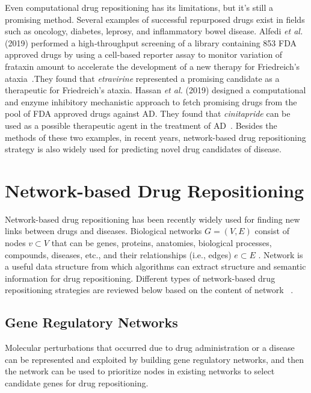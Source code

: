 Even computational drug repositioning has its limitations, but it’s still a promising method. Several examples of successful repurposed drugs exist in fields such as oncology, diabetes, leprosy, and inflammatory bowel disease. Alfedi \textit{et al.} (2019) performed a high‐throughput screening of a library containing 853 FDA approved drugs by using a cell‐based reporter assay to monitor variation of frataxin amount to accelerate the development of a new therapy for Friedreich's ataxia~\cite{kalathur_unihi_2014}.They found that \textit{etravirine} represented a promising candidate as a therapeutic for Friedreich's ataxia. Hassan \textit{et al.} (2019) designed a computational and enzyme inhibitory mechanistic approach to fetch promising drugs from the pool of FDA approved drugs against \ac{AD}. They found that \textit{cinitapride} can be used as a possible therapeutic agent in the treatment of \ac{AD}~\cite{law_drugbank_2014}. Besides the methods of these two examples, in recent years, network-based drug repositioning strategy is also widely used for predicting novel drug candidates of disease. 

\section{Network-based Drug Repositioning} \label{network_based}

Network-based drug repositioning has been recently widely used for finding new links between drugs and diseases. Biological networks $G = (V, E)$ consist of nodes $v \subset V$ that can be genes, proteins, anatomies, biological processes, compounds, diseases, etc., and their relationships (i.e., edges) $e \subset E$ . Network is a useful data structure from which algorithms can extract structure and semantic information for drug repositioning. Different types of network-based drug repositioning strategies are reviewed below based on the content of network ~\cite{lotfi_shahreza_review_2018}.

\subsection{Gene Regulatory Networks}

Molecular perturbations that occurred due to drug administration or a disease can be represented and exploited by building gene regulatory networks, and then the network can be used to prioritize nodes in existing networks to select candidate genes for drug repositioning.

